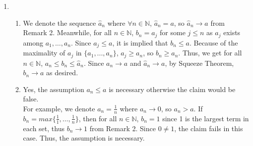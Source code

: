 \documentclass{article}
\newtheorem{remark}{Remark}
\begin{document}
\begin{enumerate}
\begin{enumerate}[label=\alph*)]
      \newpage
    \end{enumerate}

\begin{remark}
Let $a_n$ be a series where for all $n \in \mathbb{N}$, $a_n$ = c for some real number c. It implies that $|a_n - c| = 0 \ \ \forall n \in \mathbb{N}$. Thus, let $\epsilon > 0$ be arbitrary, $|a_n - c| < \epsilon$ for all $n \geq \mathbb{N}$ for any arbitrary $N \in \mathbb{R}$. This proves $a_n \rightarrow c$. 
\end{remark}
    
  \item 
    \begin{enumerate}[label=\alph*)]
      \item 
      We denote the sequence $\hat{a}_n$ where $\forall n \in \mathbb{N}$, $\hat{a}_n = a$, so $\hat{a}_n \rightarrow a$ from Remark 2. Meanwhile, for all $n \in \mathbb{N}$, $b_n = a_j$ for some $j \leq n$ as $a_j$ exists among $a_1, \dots, a_n$. Since $a_j \leq a$, it is implied that $b_n \leq a$. Because of the maximality of $a_j$ in $\{a_1, ..., a_n\}$, $a_j \geq a_n$, so $b_n \geq a_n$. Thus, we get for all $n \in \mathbb{N}$, $a_n \leq b_n \leq \hat{a}_n$. Since $a_n \rightarrow a$ and $\hat{a}_n \rightarrow a$, by Squeeze Theorem, $b_n \rightarrow a$ as desired. \\
      
      \item 
      Yes, the assumption $a_n \leq a$ is necessary otherwise the claim would be false. \\

      For example, we denote $a_n = \frac{1}{n}$ where $a_n \rightarrow 0$, so $a_n > a$. If $b_n = max\{\frac{1}{1}, \dots,\frac{1}{n}\}$, then for all $n \in \mathbb{N}$, $b_n = 1$ since 1 is the largest term in each set, thus $b_n \rightarrow 1$ from Remark 2. Since $0 \neq 1$, the claim fails in this case. Thus, the assumption is necessary.
    \end{enumerate}
\end{enumerate}
\end{document}
